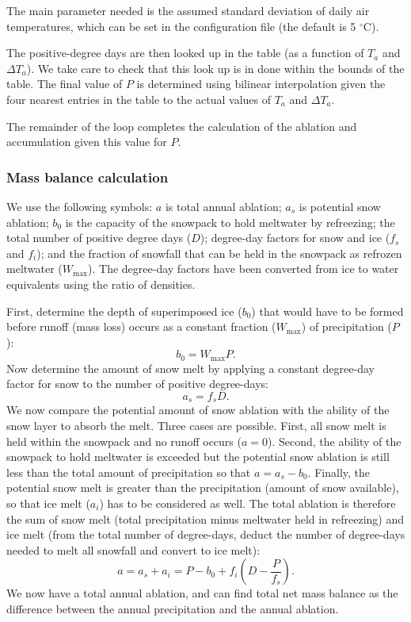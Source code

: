 The main parameter needed is the assumed standard deviation of
daily air temperatures, which can be set in the configuration file (the
default is 5 $^\circ $C). 

The positive-degree days are then looked up in the table (as a function of
$T_a$ and $\Delta T_a$). We take care to check that this look up is in done
within the bounds of the table.  The final value of $P$ is determined using
bilinear interpolation given the four nearest entries in the table to the
actual values of $T_a$ and $\Delta T_a$.

The remainder of the loop completes the calculation of the
ablation and accumulation given this value for $P$.
%
\subsubsection{Mass balance calculation} 
%
We use the following symbols: $a$ is total annual ablation; $a_s$
is potential snow ablation; $b_0$ is the capacity of the snowpack
to hold meltwater by refreezing; the total number of positive
degree days ($D$); degree-day factors for snow and ice ($f_s$ and
$f_i$); and the fraction of snowfall that can be held in the
snowpack as refrozen meltwater ($W_{\textrm{max}}$). The
degree-day factors have been converted from ice to water
equivalents using the ratio of densities.

First, determine the depth of superimposed ice ($b_0$) that would have to
be formed before runoff (mass loss) occurs as a constant fraction
($W_{\textrm{max}}$) of precipitation ($P$):
\begin{equation}
    b_0=W_{\textrm{max}} P.
\end{equation}
Now determine the amount of snow melt by applying a constant
degree-day factor for snow to the number of positive degree-days:
\begin{equation}
    a_s=f_s D.
\end{equation}
We now compare the potential amount of snow ablation with the
ability of the snow layer to absorb the melt.  Three cases are
possible. First, all snow melt is held within the snowpack and no
runoff occurs ($a=0$).  Second, the ability of the snowpack to
hold meltwater is exceeded but the potential snow ablation is
still less than the total amount of precipitation so that
$a=a_s-b_0$. Finally, the potential snow melt is greater than the
precipitation (amount of snow available), so that ice melt ($a_i$)
has to be considered as well.  The total ablation is therefore the
sum of snow melt (total precipitation minus meltwater held in
refreezing) and ice melt (from the total number of degree-days,
deduct the number of degree-days needed to melt all snowfall and convert
to ice melt):
\begin{equation}
    a=a_s + a_i = P - b_0 + f_i \left( D-\frac{P}{f_s} \right).
\end{equation}
We now have a total annual ablation, and can find total net mass
balance as the difference between the annual precipitation
and the annual ablation.

